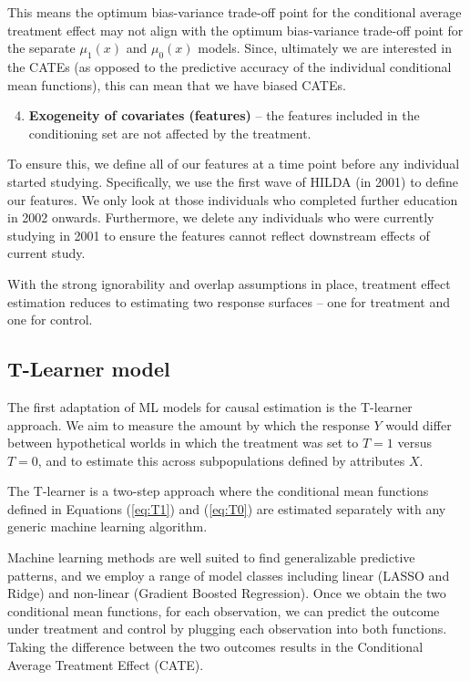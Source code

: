 \documentclass[12pt, a4paper]{article}
\begin{document}
This means the optimum bias-variance trade-off point for the conditional
average treatment effect may not align with the optimum bias-variance trade-off
point for the separate $\mu_1(x)$ and $\mu_0(x)$ models. Since, ultimately we
are interested in the CATEs (as opposed to the predictive accuracy of the
individual conditional mean functions), this can mean that we have biased
CATEs.

\begin{enumerate}
  \setcounter{enumi}{3}
  \item \textbf{Exogeneity of covariates (features)} -- the features included in the conditioning set are not affected by the treatment. 
\end{enumerate}

To ensure this, we define all of our features at a time point before any
individual started studying. Specifically, we use the first wave of HILDA (in
2001) to define our features. We only look at those individuals who completed
further education in 2002 onwards. Furthermore, we delete any individuals who
were currently studying in 2001 to ensure the features cannot reflect
downstream effects of current study. 

With the strong ignorability and overlap assumptions in place, treatment effect estimation reduces to estimating two response surfaces – one for treatment and one for control.

\subsection{T-Learner model}

The first adaptation of ML models for causal estimation is the T-learner approach. We aim to measure the amount by which the
response $Y$ would differ between hypothetical worlds in which the treatment
was set to $T=1$ versus $T=0$, and to estimate this across subpopulations
defined by attributes $X$. 

The T-learner is a two-step approach where the conditional mean functions defined in Equations (\ref{eq:T1}) and (\ref{eq:T0}) are estimated separately with any generic machine learning algorithm.

Machine learning methods are well suited to find generalizable predictive patterns, and we employ a range of model classes including linear (LASSO and Ridge) and non-linear (Gradient Boosted Regression). Once we obtain the two conditional mean functions, for each observation, we can predict the outcome under treatment and control by plugging each observation into both functions. Taking the difference between the two outcomes results in the Conditional Average Treatment Effect (CATE).
\end{document}
